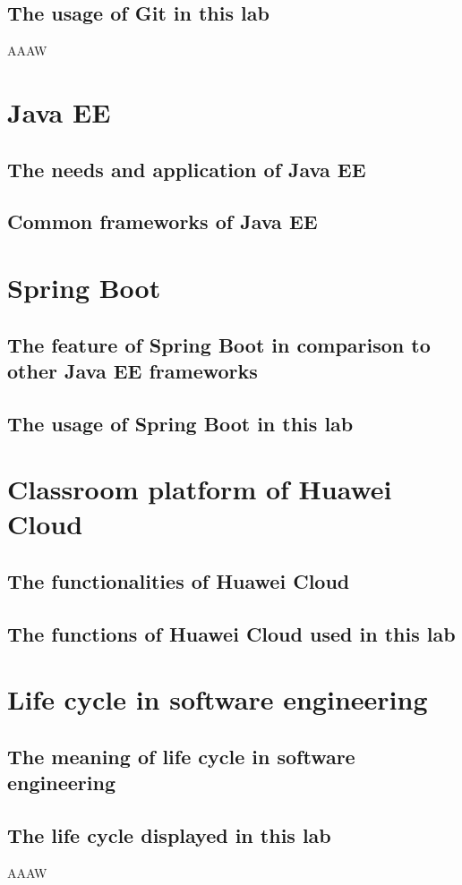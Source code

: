 \documentclass[a4paper]{report}
\begin{document}
\subsection{The usage of Git in this lab}
AAAW
\section{Java EE}
\subsection{The needs and application of Java EE}
\subsection{Common frameworks of Java EE}
\section{Spring Boot}
\subsection{The feature of Spring Boot in comparison to other Java EE frameworks}
\subsection{The usage of Spring Boot in this lab}
\section{Classroom platform of Huawei Cloud}
\subsection{The functionalities of Huawei Cloud}
\subsection{The functions of Huawei Cloud used in this lab}
\section{Life cycle in software engineering}
\subsection{The meaning of life cycle in software engineering}
\subsection{The life cycle displayed in this lab}
AAAW
\end{document}
